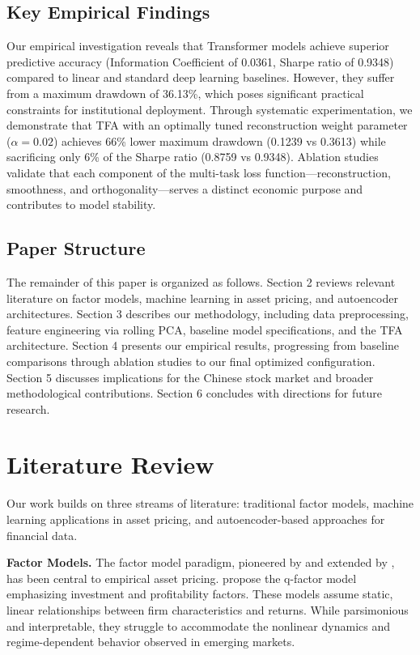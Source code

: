 \documentclass[12pt]{article}
\begin{document}
\subsection{Key Empirical Findings}

Our empirical investigation reveals that Transformer models achieve superior predictive accuracy (Information Coefficient of 0.0361, Sharpe ratio of 0.9348) compared to linear and standard deep learning baselines. However, they suffer from a maximum drawdown of 36.13\%, which poses significant practical constraints for institutional deployment. Through systematic experimentation, we demonstrate that TFA with an optimally tuned reconstruction weight parameter ($\alpha=0.02$) achieves 66\% lower maximum drawdown (0.1239 vs 0.3613) while sacrificing only 6\% of the Sharpe ratio (0.8759 vs 0.9348). Ablation studies validate that each component of the multi-task loss function—reconstruction, smoothness, and orthogonality—serves a distinct economic purpose and contributes to model stability.

\subsection{Paper Structure}

The remainder of this paper is organized as follows. Section 2 reviews relevant literature on factor models, machine learning in asset pricing, and autoencoder architectures. Section 3 describes our methodology, including data preprocessing, feature engineering via rolling PCA, baseline model specifications, and the TFA architecture. Section 4 presents our empirical results, progressing from baseline comparisons through ablation studies to our final optimized configuration. Section 5 discusses implications for the Chinese stock market and broader methodological contributions. Section 6 concludes with directions for future research.

\section{Literature Review}

Our work builds on three streams of literature: traditional factor models, machine learning applications in asset pricing, and autoencoder-based approaches for financial data.

\textbf{Factor Models.} The factor model paradigm, pioneered by \cite{fama1993common} and extended by \cite{fama2015five}, has been central to empirical asset pricing. \cite{hou2015digesting} propose the q-factor model emphasizing investment and profitability factors. These models assume static, linear relationships between firm characteristics and returns. While parsimonious and interpretable, they struggle to accommodate the nonlinear dynamics and regime-dependent behavior observed in emerging markets.
\end{document}
